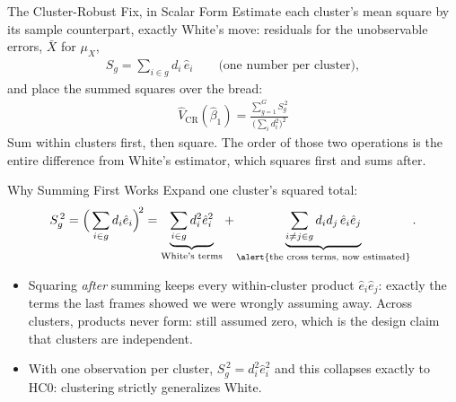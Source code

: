 \documentclass[aspectratio=169,11pt,xcolor=dvipsnames]{beamer}
\begin{document}
\begin{frame}{The Cluster-Robust Fix, in Scalar Form}
Estimate each cluster's mean square by its sample counterpart, exactly
White's move: residuals for the unobservable errors, $\bar X$ for $\mu_X$,
\begin{align*}
  S_g = \sum_{i \in g} d_i\, \hat e_i
  \qquad \text{(one number per cluster)},
\end{align*}
and place the summed squares over the bread:
\begin{align*}
  \boxed{\;
  \hat V_{\text{CR}}(\hat\beta_1)
  = \frac{\sum_{g=1}^{G} S_g^{\,2}}
         {\Big(\sum_i d_i^2\Big)^{2}} \;}
\end{align*}
\alert{Sum within clusters first, then square.} The order of those two
operations is the entire difference from White's estimator, which squares
first and sums after.
\end{frame}

\begin{frame}{Why Summing First Works}
Expand one cluster's squared total:
\begin{align*}
  S_g^{\,2}
  = \Big(\sum_{i\in g} d_i\hat e_i\Big)^{\!2}
  = \underbrace{\sum_{i\in g} d_i^2\hat e_i^2}_{\text{White's terms}}
  + \underbrace{\sum_{i\neq j \in g} d_i d_j\, \hat e_i\hat e_j}
      _{\text{\alert{the cross terms, now estimated}}} .
\end{align*}
\begin{itemize}\itemsep3pt
  \item Squaring \emph{after} summing keeps every within-cluster product
        $\hat e_i\hat e_j$: exactly the terms the last frames showed we were
        wrongly assuming away. Across clusters, products never form:
        still assumed zero, which is the design claim that clusters are
        independent.
  \item With one observation per cluster, $S_g^{\,2} = d_i^2\hat e_i^2$ and
        this collapses exactly to HC0: clustering strictly generalizes White.
\end{itemize}
\end{frame}
\end{document}
